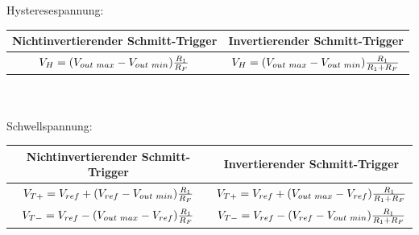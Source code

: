 			\begin{minipage}{18cm}
               	Hysteresespannung:\\
               	\hspace*{10mm}
               	\begin{tabular}{| c | c |}
                \hline
                Nichtinvertierender Schmitt-Trigger & Invertierender
                Schmitt-Trigger\\
                \hline
                $V_H=(V_{out \hspace{1mm} max}-V_{out \hspace{1mm}
                min})\frac{R_1}{R_F}$ &
                $V_H=(V_{out \hspace{1mm} max}-V_{out \hspace{1mm}
                min})\frac{R_1}{R_1+R_F}$\\
                \hline
            \end{tabular}\\ \\
				Schwellspannung:\\
				\hspace*{10mm}
			\begin{tabular}{| c | c |}
                \hline
                Nichtinvertierender Schmitt-Trigger & Invertierender
                Schmitt-Trigger\\
                \hline
                $V_{T+}=V_{ref}+(V_{ref}-V_{out
                \hspace{1mm} min})\frac{R_1}{R_F}$ &
                $V_{T+}=V_{ref}+(V_{out \hspace{1mm}
                max}-V_{ref})\frac{R_1}{R_1+R_F}$\\
                \hline
                $V_{T-}=V_{ref}-(V_{out
                \hspace{1mm} max}-V_{ref})\frac{R_1}{R_F}$ &
                $V_{T-}=V_{ref}-(V_{ref}-V_{out \hspace{1mm}
                min})\frac{R_1}{R_1+R_F}$\\
                \hline
            \end{tabular}\\
            \end{minipage}
	
